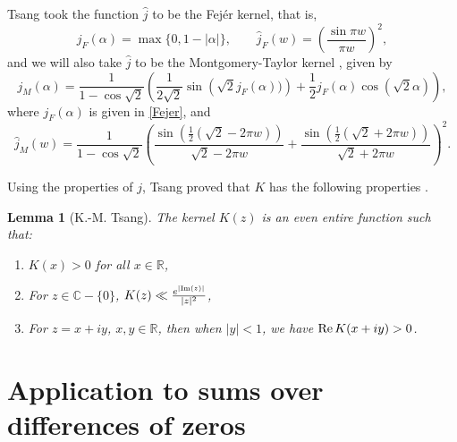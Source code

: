 \documentclass{amsart}
\newcommand{\1}{\mathbbm{1}}
\newtheorem{lem}{Lemma}
\theoremstyle{remark}
\numberwithin{equation}{section}
\begin{document}
Tsang took the function $\widehat j$ to be the Fej\'er kernel, that is, 
\begin{equation}\label{Fejer}j_F(\alpha)=\max\{0,1-|\alpha|\}, \qquad \widehat j_F(w)= \left(\frac{\sin \pi w}{\pi w}\right)^2, \end{equation}
and we will also take $\widehat j$ to be the Montgomery-Taylor kernel \cite{Montgomery74}, \cite{CheerGold} given by
\begin{equation}\label{ M-T}
j_M(\alpha) = \frac1{1 - \cos{\sqrt{2}}}\left(\frac1{2\sqrt{2}}\sin\left(\sqrt{2}j_F(\alpha))\right) + \frac12j_F(\alpha)\cos\left(\sqrt{2}\alpha\right)\right), \end{equation}
where $j_F(\alpha)$ is given in \eqref{Fejer}, and 
\begin{equation}
\widehat j_M(w) = \frac1{1 - \cos{\sqrt{2}}}\left(\frac{\sin(\frac12(\sqrt{2}-2\pi w))}{\sqrt{2}-2\pi w} + \frac{\sin(\frac12(\sqrt{2}+2\pi w))}{\sqrt{2}+2\pi w} \right)^2.
\end{equation}


Using the properties of $j$, Tsang proved that $K$ has the following properties \cite[Lemma 1]{Tsang3}. 
\begin{lem}[K.-M. Tsang]\label{lemTsang} The kernel $K(z)$ is an even entire function such that:
\begin{enumerate}[label={(\alph*)}]
\item\label{lemTsang-a} $K(x)>0$ for all $x \in \mathbb{R}$,

\item\label{lemTsang-b} For $z\in\mathbb{C}-\{0\}$, $K(z) \ll \frac{e^{|{\rm Im}(z)|}}{|z|^2}$,

\item\label{lemTsang-c} For $z=x+iy$, $x,y\in \mathbb{R}$, then when $|y|<1$, we have ${\rm Re}\,K(x+i y)>0$.
\end{enumerate}
\end{lem}


\section{Application to sums over differences of zeros}
\label{sec-sum-diff-zeros}
\end{document}
